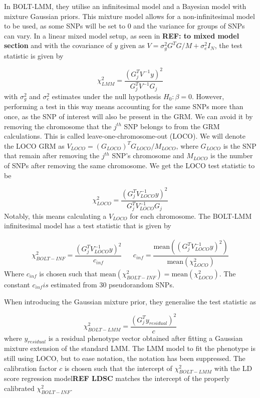 In BOLT-LMM, they utilise an infinitesimal model and a Bayesian model with mixture Gaussian priors. This mixture model allows for a non-infinitesimal model to be used, as some SNPs will be set to $ 0 $ and the variance for groups of SNPs can vary.  In a linear mixed model setup, as seen in \textbf{REF: to mixed model section} and with the covariance of $ y $ given as $V = \sigma_g^2G^TG/M + \sigma_e^2I_N $, the test statistic is given by

\begin{equation}\label{eq:boltLMMchisq}
\chi^2_{LMM} = \dfrac{(G_j^TV^{-1}y)^2}{G_j^TV^{-1}G_j}
\end{equation}
with $ \sigma_g^2 $ and $ \sigma_e^2 $ estimates under the null hypothesis $ H_0: \beta = 0 $. However, performing a test in this way means accounting for the same SNPs more than once, as the SNP of interest will also be present in the GRM. We can avoid it by removing the chromosome that the $ j^{th} $ SNP belongs to from the GRM calculations. This is called leave-one-chromosome-out (LOCO). We will denote the LOCO GRM as $ V_{LOCO} = (G_{LOCO})^TG_{LOCO}/M_{LOCO}$, where $ G_{LOCO} $ is the SNP that remain after removing the $ j^{th} $ SNP's chromosome and $ M_{LOCO} $ is the number of SNPs after removing the same chromosome. We get the LOCO test statistic to be

\begin{equation}\label{eq:boltLMMchisqLOCO}
\chi^2_{LOCO} = \dfrac{(G_j^TV_{LOCO}^{-1}y)^2}{G_j^TV_{LOCO}^{-1}G_j}
\end{equation}
Notably, this means calculating a $ V_{LOCO} $ for each chromosome. The BOLT-LMM infinitesimal model has a test statistic that is given by

\begin{align}\label{eq:boltLMMinfchisq}
\chi^2_{BOLT-INF} = \dfrac{(G_j^TV_{LOCO}^{-1}y)^2}{c_{inf}} & &c_{inf} = \dfrac{\text{mean}((G_j^TV_{LOCO}^{-1}y)^2)}{\text{mean}(\chi^2_{LOCO})}
\end{align}
Where $ c_{inf} $ is chosen such that $ \text{mean}(\chi^2_{BOLT-INF}) = \text{mean}(\chi^2_{LOCO})$. The constant $ c_{inf} is $ estimated from $ 30 $ pseudorandom SNPs.

When introducing the Gaussian mixture prior, they generalise the test statistic as

\begin{equation}\label{eq:boltMixturePriorTestChisq}
\chi^2_{BOLT-LMM} = \dfrac{\left( G_j^T y_{residual}\right)^2}{c}
\end{equation}
where $ y_{residual} $ is a residual phenotype vector obtained after fitting a Gaussian mixture extension of the standard LMM. The LMM model to fit the phenotype is still using LOCO, but to ease notation, the notation has been suppressed. The calibration factor $ c $ is chosen such that the intercept of $ \chi^2_{BOLT-LMM} $ with the LD score regression model\textbf{REF LDSC} matches the intercept of the properly calibrated $ \chi^2_{BOLT-INF} $.

